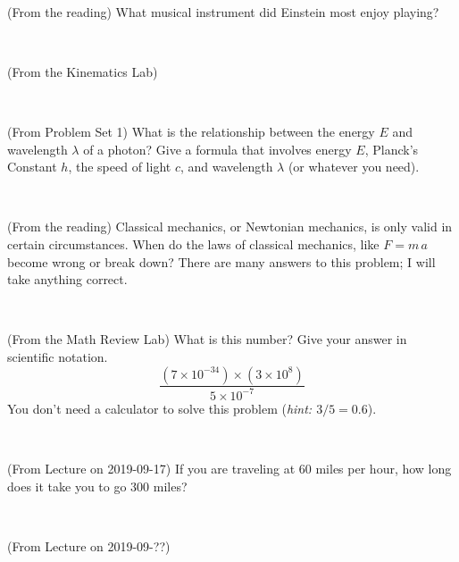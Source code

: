\documentclass[12pt, letterpaper]{article}
\begin{document}
\vfill ~

\begin{problem} (From the reading)
What musical instrument did Einstein most enjoy playing?
\end{problem}


\vfill ~

\begin{problem} (From the Kinematics Lab)

\end{problem}


\vfill ~

\begin{problem} (From Problem Set 1)
What is the relationship between the energy $E$ and wavelength
$\lambda$ of a photon? Give a formula that involves energy $E$,
Planck's Constant $h$, the speed of light $c$, and wavelength
$\lambda$ (or whatever you need).
\end{problem}

\vfill ~


\clearpage


\begin{problem} (From the reading)
Classical mechanics, or Newtonian mechanics, is only valid in certain
circumstances. When do the laws of classical mechanics, like $F =
m\,a$ become wrong or break down? There are many answers to this
problem; I will take anything correct.
\end{problem}


\vfill ~

\begin{problem} (From the Math Review Lab)
What is this number? Give your answer in scientific notation.
$$
\frac{(7\times10^{-34})\times(3\times10^8)}{5\times10^{-7}}
$$
You don't need a calculator to solve this problem (\textit{hint: $3/5=0.6$}).
\end{problem}


\vfill ~

\begin{problem} (From Lecture on 2019-09-17)
If you are traveling at 60 miles per hour, how long does
it take you to go 300 miles?
\end{problem}


\vfill ~

\begin{problem} (From Lecture on 2019-09-??)
\end{problem}


\vfill ~


\cleardoublepage
\end{document}
